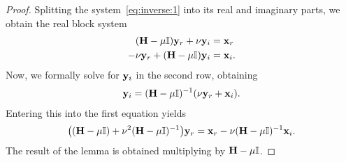 \begin{proof}
  Splitting the system~\eqref{eq:inverse:1} into its real and
  imaginary parts, we obtain the real block system
  \begin{align}
    (\mathbf H - \mu\mathbb I) \mathbf y_r + \nu \mathbf y_i &= \mathbf x_r\\
    -\nu \mathbf y_r + (\mathbf H - \mu\mathbb I) \mathbf y_i &= \mathbf x_i.
  \end{align}
  Now, we formally solve for $\mathbf y_i$ in the second row, obtaining
  \begin{gather}
    \mathbf y_i = (\mathbf H-\mu\mathbb I)^{-1}(\nu\mathbf y_r+\mathbf x_i).
  \end{gather}
  Entering this into the first equation yields
  \begin{gather}
    \bigl((\mathbf H-\mu\mathbb I) + \nu^2(\mathbf H-\mu\mathbb I)^{-1}\bigr)\mathbf y_r
    = \mathbf x_r - \nu (\mathbf H-\mu\mathbb I)^{-1}\mathbf x_i.
  \end{gather}
  The result of the lemma is obtained multiplying by $\mathbf H-\mu\mathbb I$.
\end{proof}

